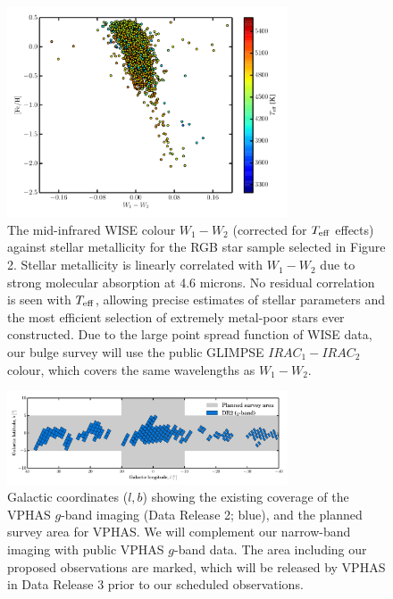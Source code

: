 \documentclass[a4paper]{article}
\begin{document}
\begin{SupportingMaterial}
\begin{figure}[t!]
\includegraphics[width=8.3cm,angle=0,clip=true]{wise-metallicity}
\caption{\label{image3}The mid-infrared WISE colour $W_1 - W_2$ (corrected for $T_{\rm eff}$ effects) against stellar metallicity for the RGB star sample selected in Figure 2. Stellar metallicity is linearly correlated with $W_1 - W_2$ due to strong molecular absorption at 4.6 microns. No residual correlation is seen with $T_{\rm eff}$, allowing precise estimates of stellar parameters and the most efficient selection of extremely metal-poor stars ever constructed. Due to the large point spread function of WISE data, our bulge survey will use the public GLIMPSE $IRAC_1 -  IRAC_2$ colour, which covers the same wavelengths as $W_1 - W_2$.}
\end{figure}


\begin{figure}
\includegraphics[width=8.3cm,angle=0,clip=true]{vphas-g}
\caption{\label{image4}Galactic coordinates ($l, b$) showing the existing coverage of the VPHAS $g$-band imaging (Data Release 2; blue), and the planned survey area for VPHAS. We will complement our narrow-band imaging with public VPHAS $g$-band data. The area including our proposed observations are marked, which will be released by VPHAS in Data Release 3 prior to our scheduled observations.}
\end{figure}

\end{SupportingMaterial}
\end{document}
